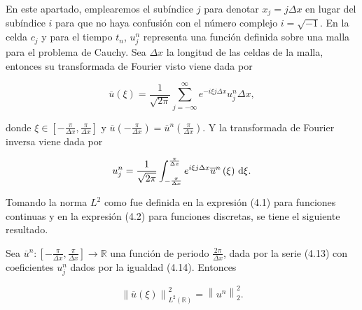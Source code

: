 En este apartado, emplearemos el subíndice $j$ para denotar
$x_{j}=j\Delta x$ en lugar del subíndice $i$ para que no haya
confusión con el número complejo $i=\sqrt{-1}$.
En la celda $c_{j}$ y para el tiempo $t_{n}$, $u^{n}_{j}$ representa
una función definida sobre una malla para el problema de Cauchy.
Sea $\Delta x$ la longitud de las celdas de la malla,
entonces su transformada de Fourier visto viene dada por

\begin{equation*}
  \overline{u}
  \left(\xi\right)=
  \frac{1}{\sqrt{2\pi}}
  \sum_{j=-\infty}^{\infty}
  e^{-i\xi j\Delta x}
  u^{n}_{j}\Delta x,
\end{equation*}

donde
\begin{math}
  \xi\in
  \left[
    -\frac{\pi}{\Delta x},
    \frac{\pi}{\Delta x}
    \right]
\end{math}
y
\begin{math}
  \overline{u}
  \left(
  -\frac{\pi}{\Delta x}
  \right)=
  \overline{u}^{n}
  \left(
  \frac{\pi}{\Delta x}
  \right)
\end{math}.
Y la transformada de Fourier inversa viene dada por

\begin{equation*}
  u^{n}_{j}=
  \frac{1}{\sqrt{2\pi}}
  \int_{-\frac{\pi}{\Delta x}}^{\frac{\pi}{\Delta x}}
  e^{i\xi j\Delta x}
  \overline{u}^{n}
  \left(\xi\right)
  \dl\xi.
\end{equation*}

Tomando la norma $L^{2}$ como fue definida en la expresión
(4.1) para funciones continuas y en la expresión (4.2) para funciones
discretas, se tiene el siguiente resultado.

\begin{theorem}
  Sea
  \begin{math}
    \overline{u}^{n}\colon
    \left[
      -\frac{\pi}{\Delta x},
      \frac{\pi}{\Delta x}
      \right]\to
    \mathbb{R}
  \end{math}
  una función de periodo $\frac{2\pi}{\Delta x}$, dada por la serie (4.13)
  con coeficientes $u^{n}_{j}$ dados por la igualdad (4.14).
  Entonces

  \begin{equation*}
    {\left\|\overline{u}\left(\xi\right)\right\|}^{2}_{L^{2}\left(\mathbb{R}\right)}=
    {\left\|u^{n}\right\|}^{2}_{2}.
  \end{equation*}
\end{theorem}

